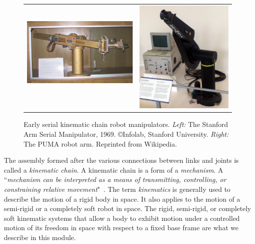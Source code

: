  \begin{figure}[b!]
 	\centering
 	\begin{tabular}{@{}c@{}c@{}}
 		\includegraphics[width=0.50\linewidth ,height=0.4\columnwidth]{figures/StanfordArm.jpg} \,\,
 		&
 		\includegraphics[width=0.48\columnwidth,height=0.4\columnwidth]{figures/PUMA.jpg}
 	\end{tabular}
 	\caption{Early serial kinematic chain robot manipulators. \textit{Left:} The Stanford Arm Serial Manipulator, 1969. \copyright Infolab, Stanford University. \textit{Right:}  The PUMA robot arm. Reprinted from Wikipedia.}
 	\label{fig:robot_arms}
 \end{figure}
The assembly formed after the various connections between links and joints is called  a \textit{kinematic chain}. A kinematic chain is a form of a \textit{mechanism}. A ``\textit{mechanism can be interpreted as a means of transmitting, controlling, or constraining relative movement}"~\cite{HuntBook1977}. The term \textit{kinematics} is generally used to describe the motion of a rigid body in space. It also applies to the motion of a semi-rigid or a  completely soft robot in space.  The rigid, semi-rigid, or completely soft kinematic systems that allow a body to exhibit motion under a controlled motion of its freedom in space with respect to a fixed base frame are what we describe in this module.

